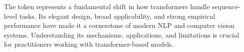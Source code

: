 The \cls{} token represents a fundamental shift in how transformers handle sequence-level tasks. Its elegant design, broad applicability, and strong empirical performance have made it a cornerstone of modern NLP and computer vision systems. Understanding its mechanisms, applications, and limitations is crucial for practitioners working with transformer-based models.